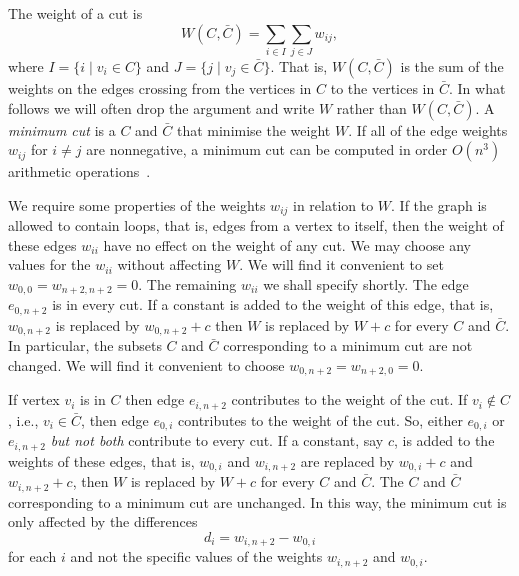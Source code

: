 \documentclass[final,leqno]{siamltex}
\begin{document}
The weight of a cut is
\[
W(C,\bar{C}) = \sum_{i \in I} \sum_{j \in J} w_{ij}, 
\]
where $I = \{ i \mid v_i \in C\}$ and $J = \{j \mid v_j \in \bar{C}\}$.  That is, $W(C,\bar{C})$ is the sum of the weights on the edges crossing from the vertices in $C$ to the vertices in $\bar{C}$.  In what follows we will often drop the argument and write $W$ rather than $W(C,\bar{C})$.  A \emph{minimum cut} is a $C$ and $\bar{C}$ that minimise the weight $W$.  If all of the edge weights $w_{ij}$ for $i \neq j$ are nonnegative, a minimum cut can be computed in 
order $O(n^3)$ arithmetic operations~\cite{Cormen2001,Even_graph_algorithms_1979}.

We require some properties of the weights $w_{ij}$ in relation to $W$.  If the graph is allowed to contain loops, that is, edges from a vertex to itself, then the weight of these edges $w_{ii}$ have no effect on the weight of any cut.  We may choose any values for the $w_{ii}$ without affecting $W$.  We will find it convenient to set $w_{0,0} = w_{n+2,n+2} = 0$.  The remaining $w_{ii}$ we shall specify shortly.  The edge $e_{0,n+2}$ is in every cut.  If a constant is added to the weight of this edge, that is, $w_{0,n+2}$ is replaced by $w_{0,n+2} + c$ then $W$ is replaced by $W + c$ for every $C$ and $\bar{C}$.  In particular, the subsets $C$ and $\bar{C}$ corresponding to a minimum cut are not changed.  We will find it convenient to choose $w_{0,n+2} = w_{n+2,0} = 0$.  

If vertex $v_i$ is in $C$ then edge $e_{i,n+2}$ contributes to the weight of the cut.  If $v_i \notin C$, i.e., $v_i \in \bar{C}$, then edge $e_{0,i}$ contributes to the weight of the cut.  So, either $e_{0,i}$ or $e_{i,n+2}$ \emph{but not both} contribute to every cut.  If a constant, say $c$, is added to the weights of these edges, that is, $w_{0,i}$ and $w_{i,n+2}$ are replaced by $w_{0,i} + c$ and $w_{i,n+2} + c$, then $W$ is replaced by $W + c$ for every $C$ and $\bar{C}$.  The $C$ and $\bar{C}$ corresponding to a minimum cut are unchanged.  In this way, the minimum cut is only affected by the differences 
\[
d_i = w_{i,n+2} - w_{0,i}
\]
for each $i$ and not the specific values of the weights $w_{i,n+2}$ and $w_{0,i}$.  %

\end{document}
